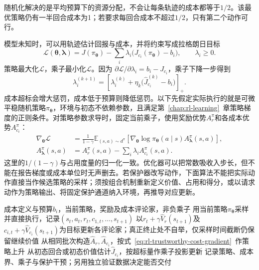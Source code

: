 随机化解决的是平均预算下的资源分配，不会让每条轨迹的成本都等于$1/2$。该最优策略仍有一半回合成本为1；若要求每回合成本不超过$1/2$，只有第二个动作可行。

模型未知时，可以用轨迹估计回报与成本，并将约束写成拉格朗日目标
\begin{equation}
  \mathcal L(\bm{\theta},\bm{\lambda})
    =J(\pi_{\bm{\theta}})
       -\sum_i\lambda_i\bigl(J_{c_i}(\pi_{\bm{\theta}})-b_i\bigr),
  \qquad \lambda_i\geq0.
  \label{eq:rl-trustworthy-lagrangian}
\end{equation}
策略最大化$\mathcal L$，乘子最小化$\mathcal L$。因为
$\partial\mathcal L/\partial\lambda_i=b_i-J_{c_i}$，乘子下降一步得到
\[
  \lambda_i^{(k+1)}
   =\left[\lambda_i^{(k)}
       +\eta_k\bigl(\widehat J_{c_i}^{(k)}-b_i\bigr)\right]_+.
\]
成本超标会增大惩罚，成本低于预算则降低惩罚。以下先假定实际执行的就是可微平稳随机策略$\pi_{\bm{\theta}}$，环境与初态不依赖参数，且满足第~\ref{chap:rl-learning}~章策略梯度的正则条件。对策略参数求导时，固定当前乘子，使用奖励优势$A_r^\pi$和各成本优势$A_{c_i}^\pi$：
\begin{equation}
  \begin{aligned}
    \nabla_{\bm{\theta}}\mathcal L
      &=\frac{1}{1-\gamma}
        \mathbb E_{(s,a)\sim d^\pi}
          \left[\nabla_{\bm{\theta}}\log\pi_{\bm{\theta}}(a\mid s)
                 A_{\bm{\lambda}}^\pi(s,a)\right],\\
    A_{\bm{\lambda}}^\pi(s,a)
      &=A_r^\pi(s,a)-\sum_i\lambda_iA_{c_i}^\pi(s,a).
  \end{aligned}
  \label{eq:rl-trustworthy-cost-gradient}
\end{equation}
这里的$1/(1-\gamma)$与占用度量的归一化一致。优化器可以把常数吸收入步长，但不能在报告梯度或成本单位时无声删去。若保护器改写动作，下面算法不能把实际动作直接当作候选策略的采样；须按组合机制重新定义价值、占用和得分，或以请求动作为策略输出、将固定保护通道纳入环境，再推导对应更新。

\begin{algorithm}
  \label{alg:rl-trustworthy-primal-dual}
  \begin{algorithmic}[1]
    \Require 成本定义与预算$b_i$，当前策略，奖励及成本评论家，非负乘子
      \State 用当前策略$\pi_{\bm{\theta}}$采样并直接执行，记录$(s_t,a_t,r_t,c_{1,t},\ldots,s_{t+1})$
      \State 以$r_t+\gamma\widehat V_r(s_{t+1})$及$c_{i,t}+\gamma\widehat V_{c_i}(s_{t+1})$为目标更新各评论家；真正终止处不自举，仅采样时间截断仍保留继续价值
      \State 从相同批次构造$\widehat A_r,\widehat A_{c_i}$，按式~\eqref{eq:rl-trustworthy-cost-gradient}~作策略上升
      \State 从初态回合或初态价值估计$\widehat J_{c_i}$，按超标量作乘子投影更新
      \State 记录策略、成本界、乘子与保护干预；另用独立验证数据决定能否交付
    \EndFor
  \end{algorithmic}
\end{algorithm}

